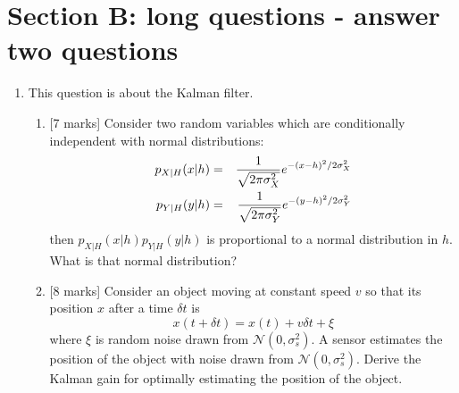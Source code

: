 \documentclass{article}
\newif\ifanswer
\begin{document}
\section*{Section B: long questions - answer two questions}

\begin{enumerate}

\item This question is about the Kalman filter. 
\begin{enumerate}
\item{}[7 marks] Consider two random variables which are conditionally independent with normal distributions:
  \begin{eqnarray}
    p_{X|H}(x|h)&=&\frac{1}{\sqrt{2\pi\sigma_X^2}}e^{-(x-h)^2/2\sigma_X^2}\cr
    p_{Y|H}(y|h)&=&\frac{1}{\sqrt{2\pi\sigma_Y^2}}e^{-(y-h)^2/2\sigma_Y^2}
  \end{eqnarray}
  then $p_{X|H}(x|h)p_{Y|H}(y|h)$ is proportional to a normal distribution in $h$. What is that normal distribution?
 
  \ifanswer \textbf{Answer}:\\  Well this is just an exercise in matching terms, with the obvious notation, you are told the multiple of the normal distributions is proportional to a normal distribution, hence
  \begin{equation}
    \exp[-\frac{(h-\mu)^2}{\sigma^2}=C \exp[-\frac{(x-h)^2}{\sigma_X^2}]    \exp[\frac{-(y-h)^2}{\sigma_Y^2}]
  \end{equation}
  where $C$ is some constant there because the relationship is a proportional one. Then taking the log of both sides and using the fact that this relationship is true for all $h$ to drop the constant terms we get 
  \begin{equation}
    \frac{1}{\sigma^2}(h^2-2h\mu)=\frac{1}{\sigma_X^2}(h^2-2hx)+\frac{1}{\sigma_Y^2}(h^2-2hy)
  \end{equation}
  so matching the coefficients of the $h$ terms and of the $h^2$ terms we get
  \begin{equation}
    \frac{1}{\sigma^2}=\frac{1}{\sigma_X^2}+\frac{1}{\sigma_Y^2}
  \end{equation}
  and
  \begin{equation}
  \mu=\frac{\sigma^2}{\sigma_X^2}x+\frac{\sigma^2}{\sigma_Y^2}y
  \end{equation}
  \fi
\item{}[8 marks] Consider an object moving at constant speed $v$ so that its position $x$ after a time $\delta t$ is
  $$
  x(t+\delta t)=x(t)+v\delta t+\xi
  $$ where $\xi$ is random noise drawn from
  $\mathcal{N}(0,\sigma^2_s)$. A sensor estimates the position of the
  object with noise drawn from $\mathcal{N}(0,\sigma^2_s)$. Derive the
  Kalman gain for optimally estimating the position of the object.


\end{enumerate}
\end{enumerate}
\end{document}
